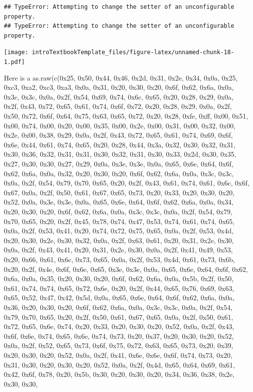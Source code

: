 \documentclass[
]{book}
\theoremstyle{definition}
\theoremstyle{definition}
\theoremstyle{definition}
\theoremstyle{remark}
\begin{document}
\begin{verbatim}
## TypeError: Attempting to change the setter of an unconfigurable property.
## TypeError: Attempting to change the setter of an unconfigurable property.
\end{verbatim}

\texttt{[image: introTextbookTemplate\_files/figure-latex/unnamed-chunk-18-1.pdf]}

Here is a as.raw(c(0x25, 0x50, 0x44, 0x46, 0x2d, 0x31, 0x2e, 0x34, 0x0a, 0x25, 0xc3, 0xa2, 0xc3, 0xa3, 0x0a, 0x31, 0x20, 0x30, 0x20, 0x6f, 0x62, 0x6a, 0x0a, 0x3c, 0x3c, 0x0a, 0x2f, 0x54, 0x69, 0x74, 0x6c, 0x65, 0x20, 0x28, 0x29, 0x0a, 0x2f, 0x43, 0x72, 0x65, 0x61, 0x74, 0x6f, 0x72, 0x20, 0x28, 0x29, 0x0a, 0x2f, 0x50, 0x72, 0x6f, 0x64, 0x75, 0x63, 0x65, 0x72, 0x20, 0x28, 0xfe, 0xff, 0x00, 0x51, 0x00, 0x74, 0x00, 0x20, 0x00, 0x35, 0x00, 0x2e, 0x00, 0x31, 0x00, 0x32, 0x00, 0x2e, 0x00, 0x38, 0x29, 0x0a, 0x2f,
0x43, 0x72, 0x65, 0x61, 0x74, 0x69, 0x6f, 0x6e, 0x44, 0x61, 0x74, 0x65, 0x20, 0x28, 0x44, 0x3a, 0x32, 0x30, 0x32, 0x31, 0x30, 0x36, 0x32, 0x31, 0x31, 0x30, 0x32, 0x31, 0x30, 0x33, 0x2d, 0x30, 0x35, 0x27, 0x30, 0x30, 0x27, 0x29, 0x0a, 0x3e, 0x3e, 0x0a, 0x65, 0x6e, 0x64, 0x6f, 0x62, 0x6a, 0x0a, 0x32, 0x20, 0x30, 0x20, 0x6f, 0x62, 0x6a, 0x0a, 0x3c, 0x3c, 0x0a, 0x2f, 0x54, 0x79, 0x70, 0x65, 0x20, 0x2f, 0x43, 0x61, 0x74, 0x61, 0x6c, 0x6f, 0x67, 0x0a, 0x2f, 0x50, 0x61, 0x67, 0x65, 0x73, 0x20, 0x33, 0x20,
0x30, 0x20, 0x52, 0x0a, 0x3e, 0x3e, 0x0a, 0x65, 0x6e, 0x64, 0x6f, 0x62, 0x6a, 0x0a, 0x34, 0x20, 0x30, 0x20, 0x6f, 0x62, 0x6a, 0x0a, 0x3c, 0x3c, 0x0a, 0x2f, 0x54, 0x79, 0x70, 0x65, 0x20, 0x2f, 0x45, 0x78, 0x74, 0x47, 0x53, 0x74, 0x61, 0x74, 0x65, 0x0a, 0x2f, 0x53, 0x41, 0x20, 0x74, 0x72, 0x75, 0x65, 0x0a, 0x2f, 0x53, 0x4d, 0x20, 0x30, 0x2e, 0x30, 0x32, 0x0a, 0x2f, 0x63, 0x61, 0x20, 0x31, 0x2e, 0x30, 0x0a, 0x2f, 0x43, 0x41, 0x20, 0x31, 0x2e, 0x30, 0x0a, 0x2f, 0x41, 0x49, 0x53, 0x20, 0x66, 0x61, 0x6c,
0x73, 0x65, 0x0a, 0x2f, 0x53, 0x4d, 0x61, 0x73, 0x6b, 0x20, 0x2f, 0x4e, 0x6f, 0x6e, 0x65, 0x3e, 0x3e, 0x0a, 0x65, 0x6e, 0x64, 0x6f, 0x62, 0x6a, 0x0a, 0x35, 0x20, 0x30, 0x20, 0x6f, 0x62, 0x6a, 0x0a, 0x5b, 0x2f, 0x50, 0x61, 0x74, 0x74, 0x65, 0x72, 0x6e, 0x20, 0x2f, 0x44, 0x65, 0x76, 0x69, 0x63, 0x65, 0x52, 0x47, 0x42, 0x5d, 0x0a, 0x65, 0x6e, 0x64, 0x6f, 0x62, 0x6a, 0x0a, 0x36, 0x20, 0x30, 0x20, 0x6f, 0x62, 0x6a, 0x0a, 0x3c, 0x3c, 0x0a, 0x2f, 0x54, 0x79, 0x70, 0x65, 0x20, 0x2f, 0x50, 0x61, 0x67, 0x65,
0x0a, 0x2f, 0x50, 0x61, 0x72, 0x65, 0x6e, 0x74, 0x20, 0x33, 0x20, 0x30, 0x20, 0x52, 0x0a, 0x2f, 0x43, 0x6f, 0x6e, 0x74, 0x65, 0x6e, 0x74, 0x73, 0x20, 0x37, 0x20, 0x30, 0x20, 0x52, 0x0a, 0x2f, 0x52, 0x65, 0x73, 0x6f, 0x75, 0x72, 0x63, 0x65, 0x73, 0x20, 0x39, 0x20, 0x30, 0x20, 0x52, 0x0a, 0x2f, 0x41, 0x6e, 0x6e, 0x6f, 0x74, 0x73, 0x20, 0x31, 0x30, 0x20, 0x30, 0x20, 0x52, 0x0a, 0x2f, 0x4d, 0x65, 0x64, 0x69, 0x61, 0x42, 0x6f, 0x78, 0x20, 0x5b, 0x30, 0x20, 0x30, 0x20, 0x34, 0x36, 0x38, 0x2e, 0x30, 0x30,
\end{document}
